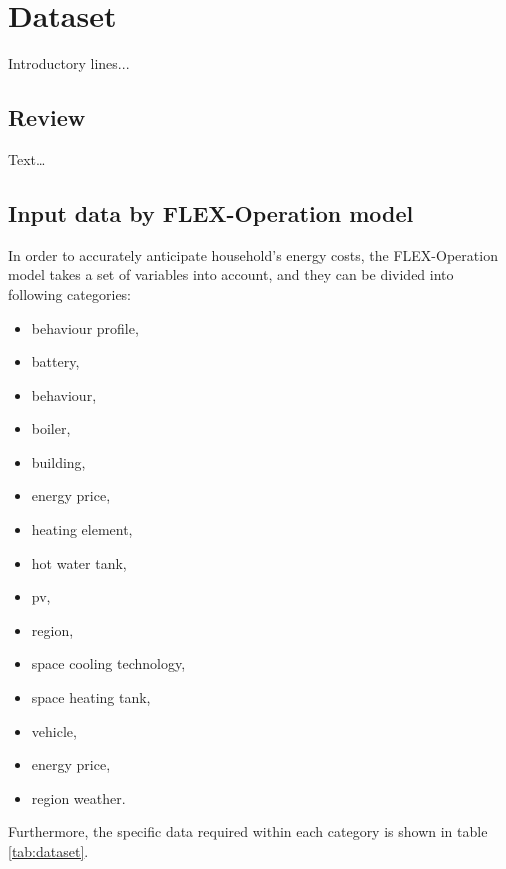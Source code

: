 \chapter{Dataset} 

Introductory lines...

\section{Review}

Text\dots

\section{Input data by FLEX-Operation model}

In order to accurately anticipate household's energy costs,
the FLEX-Operation model takes a set of variables into account,
and they can be divided into following categories: 

\begin{itemize}
    \item behaviour profile,
    \item battery,
    \item behaviour, 
    \item boiler,
    \item building,
    \item energy price,
    \item heating element, 
    \item hot water tank,
    \item \gls{pv},
    \item region,
    \item space cooling technology,
    \item space heating tank,
    \item vehicle,
    \item energy price,
    \item region weather. 
\end{itemize}

Furthermore, the specific data required within each category is shown in table \ref{tab:dataset}. 

